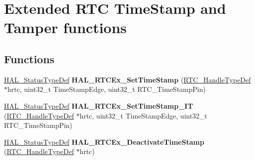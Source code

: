\hypertarget{group___r_t_c_ex___exported___functions___group1}{}\section{Extended R\+TC Time\+Stamp and Tamper functions}
\label{group___r_t_c_ex___exported___functions___group1}
\subsection*{Functions}
\begin{DoxyCompactItemize}
\item 
\mbox{\label{group___r_t_c_ex___exported___functions___group1_ga750db6ed8e6afde87530736826554019}} 
\hyperlink{stm32f0xx__hal__def_8h_a63c0679d1cb8b8c684fbb0632743478f}{H\+A\+L\+\_\+\+Status\+Type\+Def} {\bfseries H\+A\+L\+\_\+\+R\+T\+C\+Ex\+\_\+\+Set\+Time\+Stamp} (\hyperlink{struct_r_t_c___handle_type_def}{R\+T\+C\+\_\+\+Handle\+Type\+Def} $\ast$hrtc, uint32\+\_\+t Time\+Stamp\+Edge, uint32\+\_\+t R\+T\+C\+\_\+\+Time\+Stamp\+Pin)
\item 
\mbox{\label{group___r_t_c_ex___exported___functions___group1_ga96faf756e9e07d06ff1d7b696c21a6a4}} 
\hyperlink{stm32f0xx__hal__def_8h_a63c0679d1cb8b8c684fbb0632743478f}{H\+A\+L\+\_\+\+Status\+Type\+Def} {\bfseries H\+A\+L\+\_\+\+R\+T\+C\+Ex\+\_\+\+Set\+Time\+Stamp\+\_\+\+IT} (\hyperlink{struct_r_t_c___handle_type_def}{R\+T\+C\+\_\+\+Handle\+Type\+Def} $\ast$hrtc, uint32\+\_\+t Time\+Stamp\+Edge, uint32\+\_\+t R\+T\+C\+\_\+\+Time\+Stamp\+Pin)
\item 
\mbox{\label{group___r_t_c_ex___exported___functions___group1_ga1d7152fccc39480de86c555c94e222a0}} 
\hyperlink{stm32f0xx__hal__def_8h_a63c0679d1cb8b8c684fbb0632743478f}{H\+A\+L\+\_\+\+Status\+Type\+Def} {\bfseries H\+A\+L\+\_\+\+R\+T\+C\+Ex\+\_\+\+Deactivate\+Time\+Stamp} (\hyperlink{struct_r_t_c___handle_type_def}{R\+T\+C\+\_\+\+Handle\+Type\+Def} $\ast$hrtc)
\item 
\mbox{\label{group___r_t_c_ex___exported___functions___group1_ga68d83277bafa5fcebd10f1bd83ef059e}} 

\end{DoxyCompactItemize}
